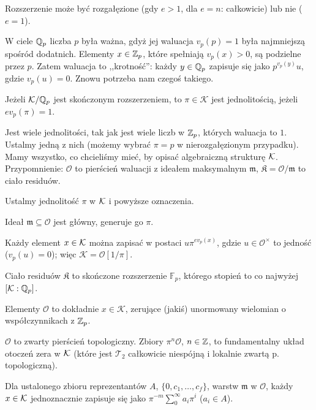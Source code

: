 Rozszerzenie może być rozgałęzione (gdy $e > 1$, dla $e = n$: całkowicie) lub nie ($e = 1$).

W ciele $\mathbb Q_p$ liczba $p$ była ważna, gdyż jej waluacja $v_p(p) = 1$ była najmniejszą spośród dodatnich.
Elementy $x \in \mathbb Z_p$, które spełniają $v_p(x) > 0$, są podzielne przez $p$.
Zatem waluacja to ,,krotność'': każdy $y \in \mathbb Q_p$ zapisuje się jako $p^{v_p(y)} u$, gdzie $v_p(u) = 0$.
Znowu potrzeba nam czegoś takiego.

\begin{definicja}
	Jeżeli $\mathcal K/\mathbb Q_p$ jest skończonym rozszerzeniem, to $\pi \in \mathcal K$ jest jednolitością, jeżeli $ev_p(\pi) = 1$.
\end{definicja}

Jest wiele jednolitości, tak jak jest wiele liczb w $\mathbb Z_p$, których waluacja to $1$.
Ustalmy jedną z nich (możemy wybrać $\pi = p$ w nierozgałęzionym przypadku).
Mamy wszystko, co chcieliśmy mieć, by opisać algebraiczną strukturę $\mathcal K$.
Przypomnienie: $\mathcal O$ to pierścień waluacji z ideałem maksymalnym $\mathfrak m$, $\mathfrak K = \mathcal O / \mathfrak m$ to ciało residuów.

\begin{fakt}
	Ustalmy jednolitość $\pi$ w $\mathcal K$ i powyższe oznaczenia.
	\begin{enumx}
		\item Ideał $\mathfrak m \subseteq \mathcal O$ jest główny, generuje go $\pi$.
		\item Każdy element $x \in \mathcal K$ można zapisać w postaci $u\pi^{ev_p(x)}$, gdzie $u \in \mathcal O^\times$ to jedność ($v_p(u) = 0$); więc $\mathcal K = \mathcal O[1/\pi]$.
		\item Ciało residuów $\mathfrak K$ to skończone rozszerzenie $\mathbb F_p$, którego stopień to co najwyżej $[\mathcal K : \mathbb Q_p]$.
		\item Elementy $\mathcal O$ to dokładnie $x \in \mathcal K$, zerujące (jakiś) unormowany wielomian o współczynnikach z $\mathbb Z_p$.
		\item $\mathcal O$ to zwarty pierścień topologiczny. Zbiory $\pi^n \mathcal O$, $n \in \mathbb Z$, to fundamentalny układ otoczeń zera w $\mathcal K$ (które jest $\mathcal T_2$ całkowicie niespójną i lokalnie zwartą p. topologiczną).
		\item Dla ustalonego zbioru reprezentantów $A$, $\{0, c_1, \dots, c_f\}$, warstw $\mathfrak m$ w $\mathcal O$, każdy $x \in \mathcal K$ jednoznacznie zapisuje się jako $\pi^{-m} \sum_{0}^\infty a_i \pi^i$ ($a_i \in A$).
	\end{enumx}
\end{fakt}

